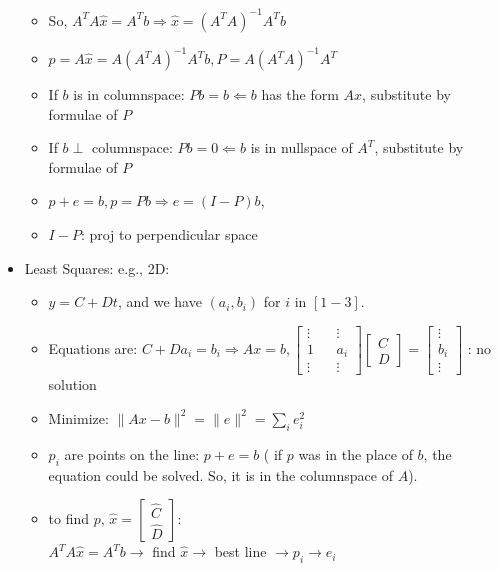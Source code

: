 \documentclass[a4paper,12pt]{article}
\begin{document}
\begin{itemize}
\begin{itemize}
			  \item So, $A^T A \hat{x} = A^T b \Longrightarrow \hat{x} = (A^T A)^{-1} A^T b$
			  
			  \item $p = A \hat{x} = A (A^T A)^{-1}A^T b, P = A (A^T A)^{-1} A^T$
			  
			  \item If $b$ is in columnspace: $Pb = b \Longleftarrow b$ has the form $Ax$, substitute by formulae of $P$
			  
			  \item If $b \perp$ columnspace: $Pb = 0 \Longleftarrow b$ is in nullspace of $A^T$, substitute by formulae of $P$
			  
			  \item $p+e = b, p = Pb \Rightarrow e = (I-P)b$,
			  
			  \item $I-P$: proj to perpendicular space
		\end{itemize}
		
		\item Least Squares: e.g., 2D:
		\begin{itemize}
			\item $y = C + Dt$, and we have $(a_i, b_i)$ for $i$ in $\left[1-3\right]$.
			\item Equations are: $C + D a_i = b_i \Longrightarrow Ax = b, 
			\begin{bmatrix}
			\vdots  && \vdots \\
			1          & & a_i    \\
			\vdots  && \vdots
			\end{bmatrix} \begin{bmatrix}
			C \\
			D
			\end{bmatrix} = \begin{bmatrix}
			\vdots \\
			b_i    \\
			\vdots
			\end{bmatrix}$ : no solution

			\item Minimize: $\lVert Ax - b \rVert ^2 = \lVert e \rVert ^2 = \sum_i e_i^2$
			
			\item $p_i$ are points on the line: $p + e = b$ ( if $p$ was in the place of $b$, the equation could be solved. So, it is in the columnspace of $A$).
			
			\item to find $p$, $\hat{x} = 
			\begin{bmatrix}
				\hat{C} \\
				\hat{D}
			\end{bmatrix}$:\\
			$A^T A \hat{x} = A^T b \rightarrow $ find $\hat{x} \rightarrow$  best line $\rightarrow p_i \rightarrow e_i$
			

\end{itemize}
\end{itemize}
\end{document}
